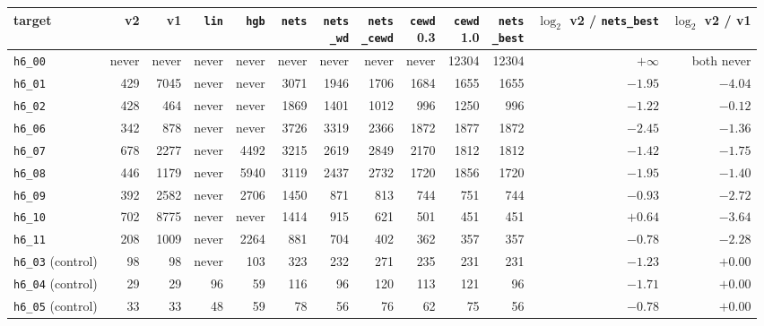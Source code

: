 \begin{tabular}{lrrrrrrrrrrrr}
\toprule
target & v2 & v1 & \texttt{lin} & \texttt{hgb} & \texttt{nets} & \hd{\texttt{nets}\\\texttt{\_wd}} & \hd{\texttt{nets}\\\texttt{\_cewd}} & \hd{\texttt{cewd}\\0.3} & \hd{\texttt{cewd}\\1.0} & \hd{\texttt{nets}\\\texttt{\_best}} & \hd{$\log_2$ v2 /\\\texttt{nets\_best}} & \hd{$\log_2$\\v2 / v1}\\
\midrule
\texttt{h6\_00} & never & never & never & never & never & never & never & never & 12304 & 12304 & $+\infty$ & both never\\
\texttt{h6\_01} & 429 & 7045 & never & never & 3071 & 1946 & 1706 & 1684 & 1655 & 1655 & $-1.95$ & $-4.04$\\
\texttt{h6\_02} & 428 & 464 & never & never & 1869 & 1401 & 1012 & 996 & 1250 & 996 & $-1.22$ & $-0.12$\\
\texttt{h6\_06} & 342 & 878 & never & never & 3726 & 3319 & 2366 & 1872 & 1877 & 1872 & $-2.45$ & $-1.36$\\
\texttt{h6\_07} & 678 & 2277 & never & 4492 & 3215 & 2619 & 2849 & 2170 & 1812 & 1812 & $-1.42$ & $-1.75$\\
\texttt{h6\_08} & 446 & 1179 & never & 5940 & 3119 & 2437 & 2732 & 1720 & 1856 & 1720 & $-1.95$ & $-1.40$\\
\texttt{h6\_09} & 392 & 2582 & never & 2706 & 1450 & 871 & 813 & 744 & 751 & 744 & $-0.93$ & $-2.72$\\
\texttt{h6\_10} & 702 & 8775 & never & never & 1414 & 915 & 621 & 501 & 451 & 451 & $+0.64$ & $-3.64$\\
\texttt{h6\_11} & 208 & 1009 & never & 2264 & 881 & 704 & 402 & 362 & 357 & 357 & $-0.78$ & $-2.28$\\
\midrule
\texttt{h6\_03} (control) & 98 & 98 & never & 103 & 323 & 232 & 271 & 235 & 231 & 231 & $-1.23$ & $+0.00$\\
\texttt{h6\_04} (control) & 29 & 29 & 96 & 59 & 116 & 96 & 120 & 113 & 121 & 96 & $-1.71$ & $+0.00$\\
\texttt{h6\_05} (control) & 33 & 33 & 48 & 59 & 78 & 56 & 76 & 62 & 75 & 56 & $-0.78$ & $+0.00$\\
\bottomrule
\end{tabular}
